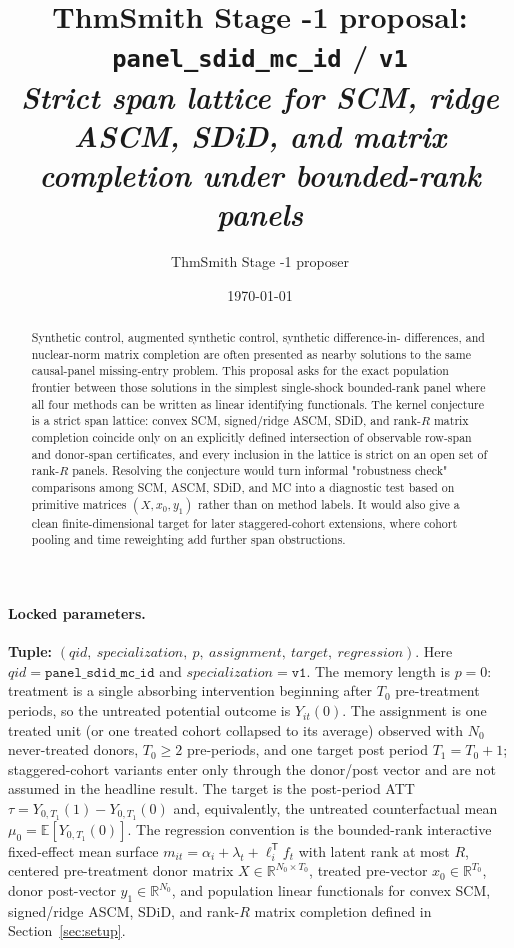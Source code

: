 \documentclass[11pt]{article}
\title{ThmSmith Stage -1 proposal: \texttt{panel\_sdid\_mc\_id} / \texttt{v1}%
  \\ \large\textit{Strict span lattice for SCM, ridge ASCM, SDiD, and matrix completion under bounded-rank panels}}
\author{ThmSmith Stage -1 proposer}
\date{\today}
\newcommand{\E}{\mathbb{E}}
\newcommand{\transpose}{\mathsf{T}}
\newcommand{\R}{\mathbb{R}}
\theoremstyle{definition}
\theoremstyle{plain}
\theoremstyle{remark}
\begin{document}
\maketitle


\paragraph{Locked parameters.}
\textbf{Tuple:} $(qid,\ specialization,\ p,\ assignment,\ target,\ regression)$.
Here $qid=\texttt{panel\_sdid\_mc\_id}$ and
$specialization=\texttt{v1}$. The memory length is $p=0$: treatment is a
single absorbing intervention beginning after $T_0$ pre-treatment periods, so
the untreated potential outcome is $Y_{it}(0)$. The assignment is one treated
unit (or one treated cohort collapsed to its average) observed with $N_0$
never-treated donors, $T_0\ge 2$ pre-periods, and one target post period
$T_1=T_0+1$; staggered-cohort variants enter only through the donor/post vector
and are not assumed in the headline result. The target is the post-period ATT
$\tau=Y_{0,T_1}(1)-Y_{0,T_1}(0)$ and, equivalently, the untreated
counterfactual mean $\mu_0=\E[Y_{0,T_1}(0)]$. The regression convention is the
bounded-rank interactive fixed-effect mean surface
$m_{it}=\alpha_i+\lambda_t+\ell_i^{\transpose}f_t$ with latent rank at most
$R$, centered pre-treatment donor matrix $X\in\R^{N_0\times T_0}$, treated
pre-vector $x_0\in\R^{T_0}$, donor post-vector $y_1\in\R^{N_0}$, and population
linear functionals for convex SCM, signed/ridge ASCM, SDiD, and rank-$R$ matrix
completion defined in Section~\ref{sec:setup}.

\begin{abstract}
Synthetic control, augmented synthetic control, synthetic difference-in-
differences, and nuclear-norm matrix completion are often presented as nearby
solutions to the same causal-panel missing-entry problem. This proposal asks
for the exact population frontier between those solutions in the simplest
single-shock bounded-rank panel where all four methods can be written as
linear identifying functionals. The kernel conjecture is a strict span lattice:
convex SCM, signed/ridge ASCM, SDiD, and rank-$R$ matrix completion coincide
only on an explicitly defined intersection of observable row-span and
donor-span certificates, and every inclusion in the lattice is strict on an
open set of rank-$R$ panels. Resolving the conjecture would turn informal
"robustness check" comparisons among SCM, ASCM, SDiD, and MC into a diagnostic
test based on primitive matrices $(X,x_0,y_1)$ rather than on method labels. It
would also give a clean finite-dimensional target for later staggered-cohort
extensions, where cohort pooling and time reweighting add further span
obstructions.
\end{abstract}
\end{document}
